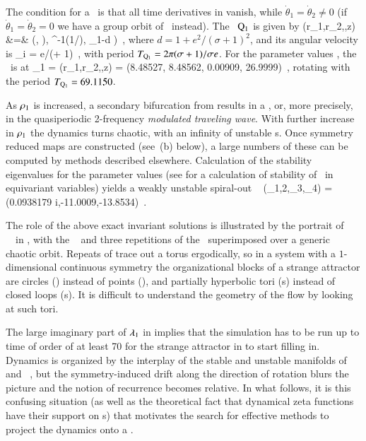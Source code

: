 \documentclass[final,number,sort&compress]{elsarticle}
\begin{document}
The condition for a \reqv\ is that all
time derivatives in  vanish, while
$\dot{\theta}_1=\dot{\theta}_2\neq 0$ (if
$\dot{\theta}_1=\dot{\theta}_2=0$ we have a group orbit
of \eqva\ instead).
The \reqv\
$\mathrm{Q}_{1}$ is given by
\bea
(r_1,r_2,\theta,z) &=&
\left(,  ),
     \cos^{-1}({1}/{}),  \rho_1-d
\right)
\,,
\label{eq:E1-PC}
\eea
where $d=1 + {e^2}/{(\sigma +1)^2}$, and
its angular velocity is
\beq
\dot{\theta}_{i}
= {\sigma e}/{(\sigma + 1)}
\,,
\label{eq:REQV1veloc}
\eeq
with period
${T_{{\mathrm{Q}_{1}}}}= 2\pi (\sigma + 1)/\sigma e$.
For the parameter values , the \reqv\ is at
\beq
\ssp_{\REQV{}1} = (r_1,r_2,\theta,z) =
     (8.48527,
      8.48562,
      0.00909,
      26.9999)
\,,
\label{eq:Q1}
\eeq
rotating with the period ${T_{{\mathrm{Q}_{1}}}}=69.1150$.

As $\rho_1$ is increased,  a secondary bifurcation from
 results in a \emph{\rpo} , or,
more precisely, in the quasiperiodic 2-frequency
\emph{modulated traveling wave}. With further
increase in $\rho_1$ the dynamics turns chaotic, with {an}
infinity of unstable {\rpo s}. Once symmetry reduced maps are
constructed (see \,(b) below), a large numbers of
these can be computed by methods described
elsewhere. Calculation of {the}
 stability eigenvalues for the parameter values
(see  for a calculation of stability of
\reqva\ in equi\-vari\-ant variables)
yields a weakly unstable spiral-out
\eqv\
\beq
(\eigExp_{1,2},\eigExp_3,\eigExp_4)
= (0.0938179  i,-11.0009,-13.8534)
\,.


The role of {the} above exact in\-vari\-ant solutions is illustrated by the
portrait of \cLf\ \statesp\ in  , with the
\reqv\ \REQV{}{1} and three repetitions of {the} \cycle{01} \rpo\
superimposed over a generic chaotic orbit. Repeats of
\cycle{01} {trace out a torus ergodically}, so in a system with
a $1$-dimensional continuous symmetry the organizational
blocks of a strange attractor are circles (\reqva) instead of
points (\eqva), and partially hyperbolic tori (\rpo s)
instead of closed loops (\po s). It is difficult to
understand the geometry of the flow by looking at such tori.

The large imaginary part of $\eigExp_{1}$ in
\refeq{eq:CLeREQBstab} implies that the simulation has to be
run up to time of order of at least 70 for the strange
attractor in \reffig{fig:CLE} to start filling in. Dynamics
is organized by the interplay of the stable and unstable
manifolds of \eqv\ \EQV{0} and \reqv\ \REQV{}{1}, but the
symmetry-induced drift along the direction of rotation blurs
the picture and the notion of recurrence becomes relative. In
what follows, it is this confusing situation (as well as the
theoretical fact\rf{Cvi07} that dynamical zeta functions have
their support on \rpo s) that motivates the search for
effective methods to project the dynamics onto a \reducedsp.
\end{document}
